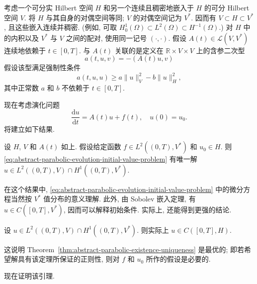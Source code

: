考虑一个可分实 Hilbert 空间 $H$ 和另一个连续且稠密地嵌入于 $H$ 的可分 Hilbert 空间 $V$. 将 $H$ 与其自身的对偶空间等同; $V$ 的对偶空间记为 $V^*$. 因而有 $V\subset H\subset V^*$, 且这些嵌入连续并稠密. (例如, 可取 $H_0^1(\Omega)\subset L^2(\Omega)\subset H^{-1}(\Omega)$.) 对 $H$ 中的内积以及 $V^*$ 与 $V$ 之间的配对, 使用同一记号 $(\cdot,\cdot)$. 假设 $A(t)\in\mathcal{L}(V,V^*)$ 连续地依赖于 $t\in[0,T]$. 与 $A(t)$ 关联的是定义在 $\mathbb{R}\times V\times V$ 上的含参二次型
\begin{equation}\label{eq:abstract-parabolic-parameterized-quadratic-form}
a(t,u,v)=-(A(t)u,v)
\end{equation}
假设该型满足强制性条件
\begin{equation}\label{eq:abstract-parabolic-form-coercivity}
a(t,u,u)\geq a\|u\|_V^2-b\|u\|_H^2,
\end{equation}
其中正常数 $a$ 和 $b$ 不依赖于 $t\in[0,T]$.

现在考虑演化问题
\begin{equation}\label{eq:abstract-parabolic-evolution-initial-value-problem}
\dfrac{\mathrm{d}u}{\mathrm{d}t}=A(t)u+f(t),\quad u(0)=u_0.
\end{equation}
将建立如下结果.

\begin{Theorem}
\label{thm:abstract-parabolic-existence-uniqueness}
设 $H$, $V$ 和 $A(t)$ 如上. 假设给定函数 $f\in L^2((0,T),V^*)$ 和 $u_0\in H$. 则 \eqref{eq:abstract-parabolic-evolution-initial-value-problem} 有唯一解 $u\in L^2((0,T),V)\cap H^1((0,T),V^*)$.
\end{Theorem}

在这个结果中, \eqref{eq:abstract-parabolic-evolution-initial-value-problem} 中的微分方程当然按 $V^*$ 值分布的意义理解. 此外, 由 Sobolev 嵌入定理, 有 $u\in C([0,T],V^*)$, 因而可以解释初始条件. 实际上, 还能得到更强的结论.

\begin{Lemma}
\label{lem:parabolic-energy-space-hilbert-continuity}
设 $u\in L^2((0,T),V)\cap H^1((0,T),V^*)$. 则实际上 $u\in C([0,T],H)$.
\end{Lemma}

这说明 Theorem~\ref{thm:abstract-parabolic-existence-uniqueness} 是最优的; 即若希望解具有该定理所保证的正则性, 则对 $f$ 和 $u_0$ 所作的假设是必要的.\par 现在证明该引理.

